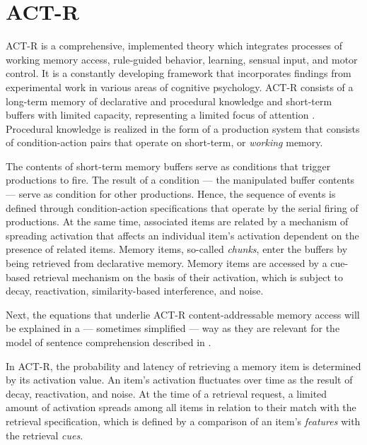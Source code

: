 \documentclass{cambridge7A}\usepackage[]{graphicx}\usepackage[]{color}
\begin{document}
\section{ACT-R}
ACT-R is a  comprehensive, implemented theory which integrates processes of working memory access, rule-guided behavior, learning, sensual input, and motor control. 
It is a constantly developing framework that incorporates  findings from experimental work in various areas of cognitive psychology. 
ACT-R consists of a long-term memory of declarative and procedural knowledge and  short-term buffers with limited capacity, representing a limited focus of attention \citep{McElree2006,Cowan2001,Miller1956}. 
Procedural knowledge is realized in the form of a production system \citep{Newell1973,Newell1978} that consists of condition-action pairs that operate on short-term, or \emph{working} memory. 

The contents of short-term memory buffers serve as conditions that trigger productions to fire. The result of a condition --- the manipulated buffer contents --- serve as condition for other productions. Hence, the  sequence of events is defined through condition-action specifications that operate by the serial firing of productions. 
At the same time, associated items are related by a mechanism of spreading activation that affects an individual item's activation dependent on the presence of related items. Memory items, so-called \emph{chunks}, enter the buffers by being retrieved from declarative memory. 
Memory items are accessed by a cue-based retrieval mechanism on the basis of their activation, which is subject to decay, reactivation, similarity-based interference, and noise.

Next, the equations that underlie ACT-R content-addressable memory access will be explained in a --- sometimes simplified --- way as they are relevant for the model of sentence comprehension described in \cite{LewisVasishth2005}.

In ACT-R, the probability and latency of retrieving a memory item
is determined by its activation value. An item's activation fluctuates over time as the result of decay, reactivation, and noise. At the time of a retrieval request, a limited amount of activation spreads among all items in relation to their match with the retrieval specification, which is defined by a comparison of an item's \textit{features} with the retrieval \textit{cues}.
\end{document}
